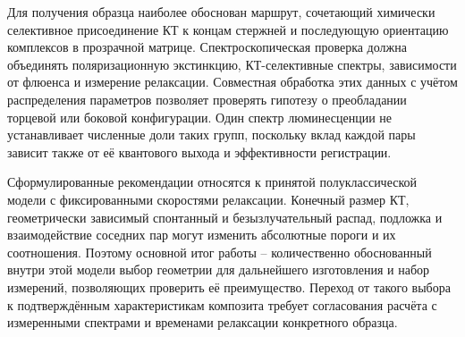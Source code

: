 Для получения образца наиболее обоснован маршрут, сочетающий
химически селективное присоединение КТ к концам стержней
и последующую ориентацию комплексов в прозрачной матрице.
Спектроскопическая проверка должна объединять поляризационную
экстинкцию, КТ-селективные спектры, зависимости от флюенса
и измерение релаксации. Совместная обработка этих данных с учётом
распределения параметров позволяет проверять гипотезу
о преобладании торцевой или боковой конфигурации. Один спектр
люминесценции не устанавливает численные доли таких групп,
поскольку вклад каждой пары зависит также от её квантового
выхода и эффективности регистрации.

Сформулированные рекомендации относятся к принятой полуклассической
модели с фиксированными скоростями релаксации. Конечный размер КТ,
геометрически зависимый спонтанный и безызлучательный распад,
подложка и взаимодействие соседних пар могут изменить абсолютные
пороги и их соотношения. Поэтому основной итог работы --
количественно обоснованный внутри этой модели выбор геометрии
для дальнейшего изготовления и набор измерений, позволяющих
проверить её преимущество. Переход от такого выбора к подтверждённым
характеристикам композита требует согласования расчёта
с измеренными спектрами и временами релаксации конкретного образца.
